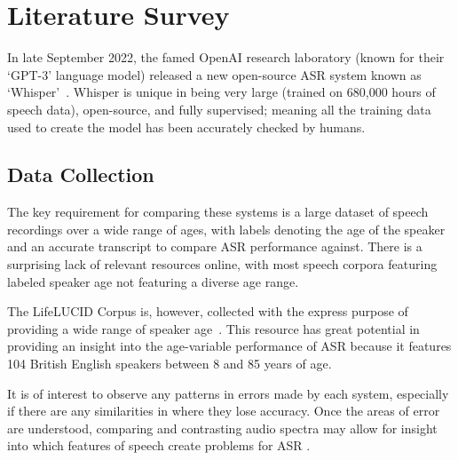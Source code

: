 \chapter{Literature Survey}\label{ch:literature-survey}

In late September 2022, the famed OpenAI research laboratory (known for their `GPT-3' language
model) released a new open-source ASR system known as `Whisper'~\cite{whisper}.
Whisper is unique in being very large (trained on 680,000 hours of speech data), open-source, and
fully supervised;
meaning all the training data used to create the model has been accurately checked by humans.

\section{Data Collection}\label{sec:data-collection}

The key requirement for comparing these systems is a large dataset of speech recordings over a
wide range of ages, with labels denoting the age of the speaker and an accurate transcript to
compare ASR performance against.
There is a surprising lack of relevant resources online, with most speech corpora featuring
labeled speaker age not featuring a diverse age range.

The LifeLUCID Corpus is, however, collected with the express purpose of providing a wide range of
speaker age~\cite{lifelucid}.
This resource has great potential in providing an insight into the age-variable performance of
ASR because it features 104 British English speakers between 8 and 85 years of age.

It is of interest to observe any patterns in errors made by each system, especially if there are
any similarities in where they lose accuracy.
Once the areas of error are understood, comparing and contrasting audio spectra may allow for
insight into which features of speech create problems for ASR .

